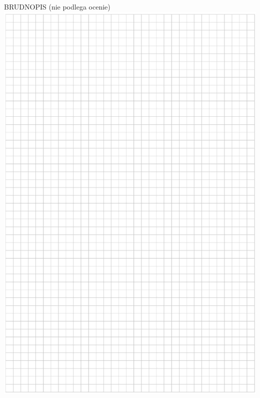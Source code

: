 \documentclass[10pt]{article}
\begin{document}
BRUDNOPIS (nie podlega ocenie)\\
\includegraphics[max width=\textwidth, center]{2024_11_21_e19607c15353cb4d7e48g-09}
\end{document}
